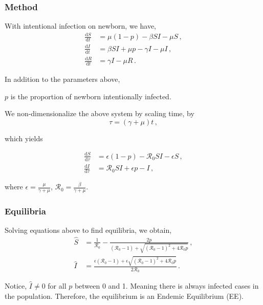 \documentclass[12pt]{beamer}
\newcommand\dbyd[2]{\frac{\mathrm d{#1}}{\mathrm d{#2}}}
\newcommand{\R}{\mathcal{R}}
\begin{document}
\begin{frame}
\frametitle{Method}
With intentional infection on newborn, we have,
\begin{equation}\label{2}
\begin{split}
\dbyd{S}{t}&=\mu(1-p)- \beta SI-\mu S \,,\\
\dbyd{I}{t}&=\beta SI+\mu p-\gamma I -\mu I\,,\\
\dbyd{R}{t}&=\gamma I-\mu R\,.
\end{split}
\end{equation}

In addition to the parameters above,

$p$ is the proportion of newborn intentionally infected.
\end{frame}
\begin{frame}
We non-dimensionalize the above system by scaling time, by
\begin{equation}
\tau=(\gamma+\mu)t \,,
\end{equation}

which yields

\begin{subequations}\label{3}
\begin{align}
\dbyd{S}{\tau}&=\epsilon(1-p)- \R_0  SI-\epsilon S \,,\\
\dbyd{I}{\tau}&=\R_0 SI+\epsilon p-I \,,
\end{align}
\end{subequations}

where $\epsilon=\frac{\mu}{\gamma+\mu}$, $\R_0=\frac{\beta}{\gamma+\mu}$.
\end{frame}
\begin{frame}
\frametitle{Equilibria}
Solving equations above to find equilibria, we obtain,
\begin{subequations}
\begin{align}
\hat{S} &=\frac{1}{\R_0}-\frac{2p}{(\R_0 -1)+ \sqrt{(\R_0-1)^2+4\R_0 p}}\,, \label{Shat1}\\
\hat{I} &= \frac{\epsilon(\R_0 -1)+ \epsilon \sqrt{(\R_0-1)^2+4\R_0
    p}}{2\R_0}\,.\label{Ihat1}
\end{align}
\end{subequations}

Notice, $\hat{I}\neq 0$ for all $p$ between 0 and 1. Meaning there is always infected cases in the population. Therefore, the equilibrium is an Endemic Equilibrium (EE).
\end{frame}
\end{document}
